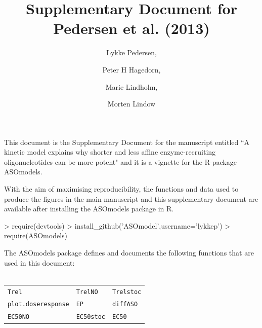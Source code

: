 \documentclass[a4paper,11pt]{article}
\title{Supplementary Document for Pedersen et al. (2013)}
\author{Lykke Pedersen, \and Peter H Hagedorn, \and Marie Lindholm, \and Morten Lindow}
\date{}
\begin{document}

\maketitle

This document is the Supplementary Document for the manuscript entitled ``A kinetic model explains why shorter and less
affine enzyme-recruiting oligonucleotides can be
more potent" and it is a vignette for the R-package ASOmodels.

With the aim of maximising reproducibility, the functions and data used to produce the figures in the main manuscript and this supplementary document are available after installing the ASOmodels package in R.
\begin{Schunk}
\begin{Sinput}
> require(devtools)
> install_github('ASOmodel',username='lykkep')
> require(ASOmodels)
\end{Sinput}
\end{Schunk}
The ASOmodels package defines and documents the following functions that are used in this document: \\
~\\
\begin{tabular}{l l l}
\texttt{Trel} & \texttt{TrelNO} & \texttt{Trelstoc} \\
\texttt{plot.doseresponse} & \texttt{EP} & \texttt{diffASO} \\
\texttt{EC50NO} & \texttt{EC50stoc} & \texttt{EC50}
\end{tabular}

\tableofcontents

\newpage

\end{document}
